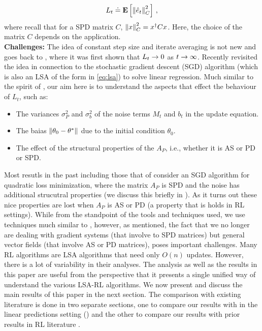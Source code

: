\documentclass{article}
\begin{document}
\begin{align*}
L_t \doteq \mathbf{E}\left[ \left\| \hat{e}_t\right\|_{C}^2 \right]\,,
\end{align*}
where recall that for a SPD matrix $C$, $\left\| x\right\|_C^2 = x^\dag C x$. Here, the choice of the matrix $C$ depends on the application.\\
\textbf{Challenges:}
The idea of constant step size and iterate averaging is not new and goes back to \cite{}, where it was first shown that $L_t\rightarrow 0$ as $t\rightarrow\infty$. Recently \cite{bach} revisited the idea in connection to the stochastic gradient descent (SGD) algorithm (which is also an LSA of the form in \eqref{eq:lsa}) to solve linear regression. Much similar to the spirit of \cite{bach}, our aim here is to understand the aspects that effect the behaviour of $L_t$, such as:
\begin{itemize}
\item The variances $\sigma_P^2$ and $\sigma_b^2$ of the noise terms $M_t$ and $b_t$ in the update equation.
\item The baias $\left\| \theta_0-\theta^*\right\|$ due to the initial condition $\theta_0$.
\item The effect of the structural properties of the $A_P$, i.e., whether it is AS or PD or SPD.
\end{itemize}
Most resutls in the past including those that of \cite{bach} consider an SGD algorithm for quadratic loss minimization, where the matrix $A_P$ is SPD and the noise has additional strucutral properties (we discuss this briefly in ). As it turns out these nice properties are lost when $A_P$ is AS or PD (a property that is holds in RL settings). While from the standpoint of the tools and techniques used, we use techniques much similar to \cite{bach}, however, as mentioned, the fact that we no longer are dealing with gradient systems (that involve to SPD matrices) but general vector fields (that involve AS or PD matrices), poses important challenges.
Many RL algorithms \cite{} are LSA algorithms that need only $O(n)$ updates. However, there is a lot of variability in their analyses. The analysis as well as the results in this paper are useful from the perspective that it presents a single unified way of understand the various LSA-RL algorithms. We now present and discuss the main results of this paper in the next section. The comparison with existing literature is done in two separate sections, one to compare our results with \cite{bach} in the linear predictions setting () and the other to compare our results with prior results in RL literature \cite{}.
\end{document}
